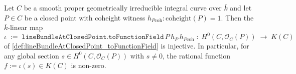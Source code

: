 \begin{lemma}


  \label{lem:lineBundleAtClosedPoint_toFunctionField_injective}
  Let \(C\) be a smooth proper geometrically irreducible integral curve
  over \(\bar k\) and let \(P\in C\) be a closed point with coheight
  witness \(h_{P\mathrm{coh}}\colon \mathrm{coheight}(P)=1\). Then the
  \(\bar k\)-linear map
  \[
    \iota \;:=\;
    \texttt{lineBundleAtClosedPoint.toFunctionField}\,P\,h_P\,h_{P\mathrm{coh}}
    \;\colon\;
    H^0(C, \mathcal O_C(P)) \;\longrightarrow\; K(C)
  \]
  of \cref{def:lineBundleAtClosedPoint_toFunctionField} is injective.
  In particular, for any global section \(s\in H^0(C, \mathcal O_C(P))\)
  with \(s\ne 0\), the rational function \(f:=\iota(s)\in K(C)\) is
  non-zero.
\end{lemma}

